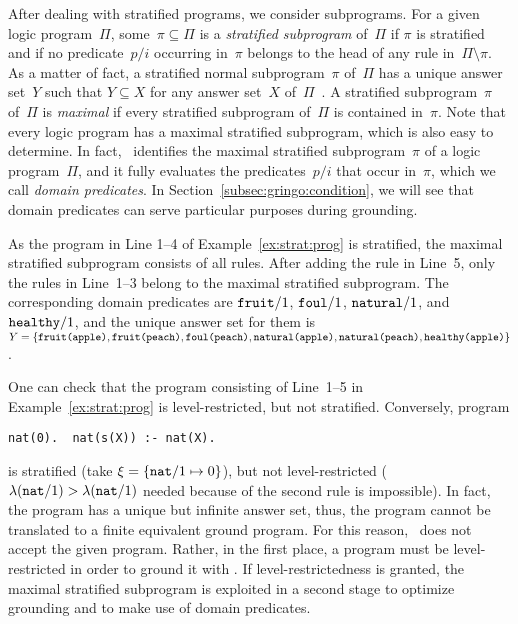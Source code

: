After dealing with stratified programs, we consider subprograms.
For a given logic program~$\Pi$, some~$\pi\subseteq\Pi$ is a 
\emph{stratified subprogram} of~$\Pi$ if
$\pi$ is stratified and if
no predicate~$p/i$ occurring in~$\pi$ belongs to the head of any rule in~$\Pi\setminus\pi$.
As a matter of fact,
a stratified normal subprogram~$\pi$ of~$\Pi$ has a unique answer set~$Y$ such that
$Y\subseteq X$ for any answer set~$X$ of~$\Pi$~\cite{liftur94a}.
A stratified subprogram~$\pi$ of~$\Pi$ is \emph{maximal} if every stratified
subprogram of~$\Pi$ is contained in~$\pi$.
Note that every logic program has a maximal stratified subprogram,
which is also easy to determine.
In fact, \gringo\ identifies the maximal stratified subprogram~$\pi$
of a logic program~$\Pi$,
and it fully evaluates the predicates~$p/i$ that occur in~$\pi$,
which we call \emph{domain predicates}.
In Section~\ref{subsec:gringo:condition},
we will see that domain predicates can serve particular purposes during grounding.

\begin{example}\label{ex:strat:max}
As the program in Line 1--4 of Example~\ref{ex:strat:prog} is stratified,
the maximal stratified subprogram consists of all rules.
After adding the rule in Line~5,
only the rules in Line~1--3 belong to the maximal stratified subprogram.
The corresponding domain predicates are
$\texttt{fruit}/1$,
$\texttt{foul}/1$,
$\texttt{natural}/1$, and
$\texttt{healthy}/1$, 
and the unique answer set for them is
$
Y
=
\{
\code{\pred{fruit}(\const{apple})},\linebreak[1]
\code{\pred{fruit}(\const{peach})},\linebreak[1]
\code{\pred{foul}(\const{peach})},\linebreak[1]
\code{\pred{natural}(\const{apple})},\linebreak[1]
\code{\pred{natural}(\const{peach})},\linebreak[1]
\code{\pred{healthy}(\const{apple})}
\}
$.
\eexample
\end{example}

One can check that the program consisting of Line~1--5
in Example~\ref{ex:strat:prog} is level-restricted, but not stratified.
Conversely, program
\begin{lstlisting}[numbers=none]
nat(0).  nat(s(X)) :- nat(X).
\end{lstlisting}
is stratified (take $\xi=\{\texttt{nat}/1 \mapsto 0\}$),
but not level-restricted
($\lambda(\texttt{nat}/1)>\lambda(\texttt{nat}/1)$
 needed because of the second rule is impossible).
In fact, the program has a unique but infinite answer set, thus,
the program cannot be translated to a finite equivalent ground program.
For this reason, \gringo\ does not accept the given program.
Rather, in the first place, a program must be level-restricted in order
to ground it with \gringo.
If level-restrictedness is granted,
the maximal stratified subprogram is exploited in a second stage
to optimize grounding and to make use of domain predicates.

